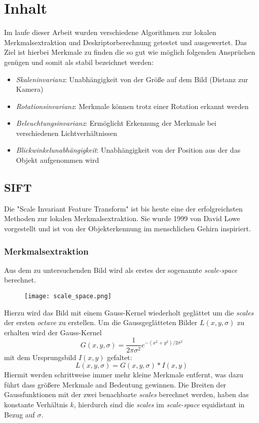 \chapter{Inhalt}

Im laufe dieser Arbeit wurden verschiedene Algorithmen zur lokalen Merkmalsextraktion und Deskriptorberechnung getestet und ausgewertet.
Das Ziel ist hierbei Merkmale zu finden die so gut wie möglich folgenden Ansprüchen genügen und somit als stabil bezeichnet werden:
\begin{itemize}
\item \emph{Skaleninvarianz}: Unabhängigkeit von der Größe auf dem Bild (Distanz zur Kamera)
\item \emph{Rotationsinvarianz}: Merkmale können trotz einer Rotation erkannt werden
\item \emph{Beleuchtungsinvarianz}: Ermöglicht Erkennung der Merkmale bei verschiedenen Lichtverhältnissen
\item \emph{Blickwinkelunabhängigkeit}: Unabhängigkeit von der Position aus der das Objekt aufgenommen wird
\end{itemize} 

\section{SIFT}

Die "Scale Invariant Feature Transform" ist bis heute eine der erfolgreichsten Methoden zur lokalen Merkmalsextraktion. Sie wurde 1999 von David Lowe vorgestellt und ist von der Objekterkennung im menschlichen Gehirn inspiriert.

\subsection{Merkmalsextraktion}

Aus dem zu untersuchenden Bild wird als erstes der sogenannte \emph{scale-space} berechnet.

\begin{figure}[h]
\texttt{[image: scale\_space.png]}
\centering
\end{figure}
Hierzu wird das Bild mit einem Gauss-Kernel wiederholt geglättet um die \emph{scales} der ersten \emph{octave} zu erstellen.
Um die Gaussgeglätteten Bilder $ L (x, y, \sigma ) $ zu erhalten wird der Gauss-Kernel 
\begin{equation}
G(x, y, \sigma) = \frac{1}{2\pi\sigma^{2}}e^{-(x^{2}+y^{2})/2\sigma^{2}}
\end{equation}
 mit dem Ursprungsbild $ I(x, y) $ gefaltet:
\begin{equation}
L(x, y, \sigma) = G(x, y, \sigma)\ast I(x, y)
\end{equation}
Hiermit werden schrittweise immer mehr kleine Merkmale entfernt, was dazu führt dass größere Merkmale and Bedeutung gewinnen.
Die Breiten der Gaussfunktionen mit der zwei benachbarte \emph{scales} berechnet werden, haben das konstante Verhältnis $ k $, hierdurch sind die \emph{scales} im \emph{scale-space} equidistant in Bezug auf $ \sigma $.

